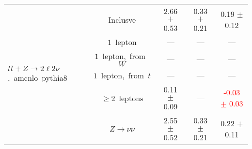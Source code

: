 \documentclass{article}
\begin{document}
\begin{longtable}{|l|c|c|c|c|}
\hline 
\multirow{6}{*}{$t\bar{t}+Z{\rightarrow}2{\ell}2{\nu}$,~amcnlo~pythia8} & Inclusve  & 2.66 $\pm$ 0.53  & 0.33 $\pm$ 0.21  & 0.19 $\pm$ 0.12 \\* 
 & $1$~lepton  & ---  & ---  & --- \\* 
 & $1$~lepton,~from~$W$  & ---  & ---  & --- \\* 
 & $1$~lepton,~from~$t$  & ---  & ---  & --- \\* 
 & $\ge2$~leptons  & 0.11 $\pm$ 0.09  & ---  & \textcolor{red}{ -0.03 $\pm$ 0.03 } \\* 
 & $Z\rightarrow\nu\nu$  & 2.55 $\pm$ 0.52  & 0.33 $\pm$ 0.21  & 0.22 $\pm$ 0.11 \\* 
\hline 
\end{longtable} 

 
 
 
 
\pagebreak 

 
 
 
 
\end{document}
